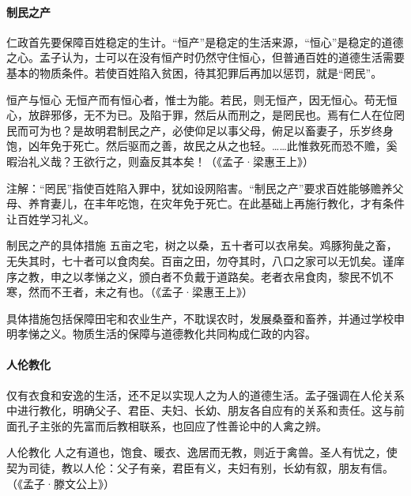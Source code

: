 \paragraph{制民之产}

仁政首先要保障百姓稳定的生计。“恒产”是稳定的生活来源，“恒心”是稳定的道德之心。孟子认为，士可以在没有恒产时仍然守住恒心，但普通百姓的道德生活需要基本的物质条件。若使百姓陷入贫困，待其犯罪后再加以惩罚，就是“罔民”。

\begin{fancybox}{恒产与恒心}
    无恒产而有恒心者，惟士为能。若民，则无恒产，因无恒心。苟无恒心，放辟邪侈，无不为已。及陷于罪，然后从而刑之，是罔民也。焉有仁人在位罔民而可为也？是故明君制民之产，必使仰足以事父母，俯足以畜妻子，乐岁终身饱，凶年免于死亡。然后驱而之善，故民之从之也轻。……此惟救死而恐不赡，奚暇治礼义哉？王欲行之，则盍反其本矣！（《孟子·梁惠王上》）
\end{fancybox}

注解：“罔民”指使百姓陷入罪中，犹如设网陷害。“制民之产”要求百姓能够赡养父母、养育妻儿，在丰年吃饱，在灾年免于死亡。在此基础上再施行教化，才有条件让百姓学习礼义。

\begin{fancybox}{制民之产的具体措施}
    五亩之宅，树之以桑，五十者可以衣帛矣。鸡豚狗彘之畜，无失其时，七十者可以食肉矣。百亩之田，勿夺其时，八口之家可以无饥矣。谨庠序之教，申之以孝悌之义，颁白者不负戴于道路矣。老者衣帛食肉，黎民不饥不寒，然而不王者，未之有也。（《孟子·梁惠王上》）
\end{fancybox}

具体措施包括保障田宅和农业生产，不耽误农时，发展桑蚕和畜养，并通过学校申明孝悌之义。物质生活的保障与道德教化共同构成仁政的内容。

\paragraph{人伦教化}

仅有衣食和安逸的生活，还不足以实现人之为人的道德生活。孟子强调在人伦关系中进行教化，明确父子、君臣、夫妇、长幼、朋友各自应有的关系和责任。这与前面孔子主张的先富而后教相联系，也回应了性善论中的人禽之辨。

\begin{fancybox}{人伦教化}
    人之有道也，饱食、暖衣、逸居而无教，则近于禽兽。圣人有忧之，使契为司徒，教以人伦：父子有亲，君臣有义，夫妇有别，长幼有叙，朋友有信。（《孟子·滕文公上》）
\end{fancybox}
